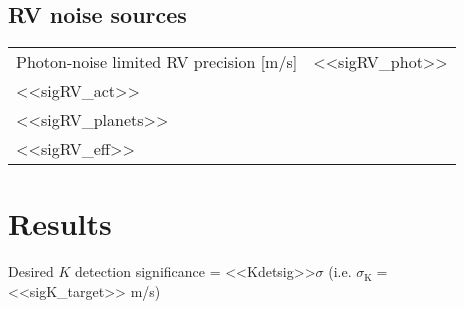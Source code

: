 \documentclass[a4paper]{article}
\begin{document}
\subsection{RV noise sources}
\begin{tabular}{ll}
  Photon-noise limited RV precision [m/s] & <<sigRV_phot>> \\
  <<sigRV_act>> \\
  <<sigRV_planets>> \\
  <<sigRV_eff>>
\end{tabular}

\pagebreak

\section{Results}
Desired $K$ detection significance = <<Kdetsig>>$\sigma$ (i.e. $\sigma_{\text{K}} =$ <<sigK_target>> m/s)
\end{document}
